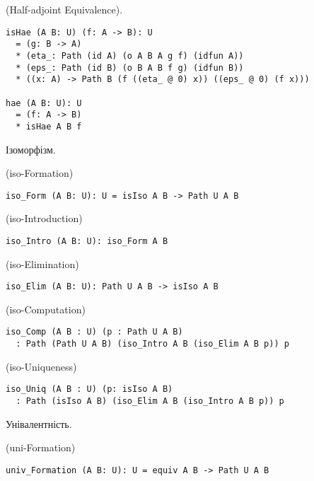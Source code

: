 \begin{definition} (Half-adjoint Equivalence).
\begin{lstlisting}
isHae (A B: U) (f: A -> B): U
  = (g: B -> A)
  * (eta_: Path (id A) (o A B A g f) (idfun A))
  * (eps_: Path (id B) (o B A B f g) (idfun B))
  * ((x: A) -> Path B (f ((eta_ @ 0) x)) ((eps_ @ 0) (f x)))

hae (A B: U): U
  = (f: A -> B)
  * isHae A B f
\end{lstlisting}
\end{definition}

Ізоморфізм.

\begin{definition} (iso-Formation)
\begin{lstlisting}
iso_Form (A B: U): U = isIso A B -> Path U A B
\end{lstlisting}
\end{definition}

\begin{definition} (iso-Introduction)
\begin{lstlisting}
iso_Intro (A B: U): iso_Form A B
\end{lstlisting}
\end{definition}

\begin{definition} (iso-Elimination)
\begin{lstlisting}
iso_Elim (A B: U): Path U A B -> isIso A B
\end{lstlisting}
\end{definition}

\begin{definition} (iso-Computation)
\begin{lstlisting}
iso_Comp (A B : U) (p : Path U A B)
  : Path (Path U A B) (iso_Intro A B (iso_Elim A B p)) p
\end{lstlisting}
\end{definition}

\begin{definition} (iso-Uniqueness)
\begin{lstlisting}
iso_Uniq (A B : U) (p: isIso A B)
  : Path (isIso A B) (iso_Elim A B (iso_Intro A B p)) p
\end{lstlisting}
\end{definition}

Унівалентність.

\begin{definition} (uni-Formation)
\begin{lstlisting}
univ_Formation (A B: U): U = equiv A B -> Path U A B
\end{lstlisting}
\end{definition}

